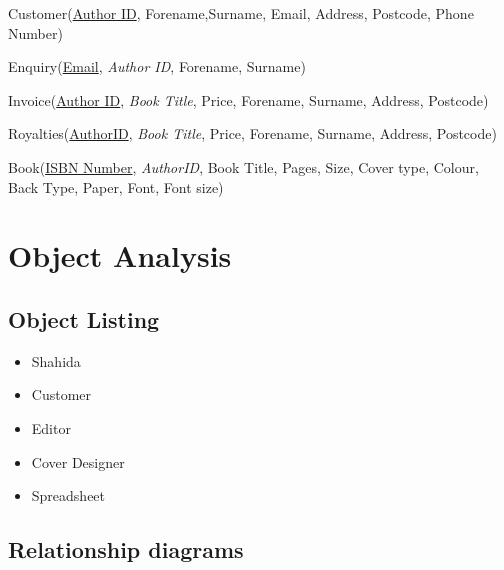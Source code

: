 Customer(\underline{Author ID}, Forename,Surname, Email, Address, Postcode, Phone Number)

Enquiry(\underline{Email}, \emph{Author ID}, Forename, Surname)

Invoice(\underline{Author ID}, \emph{Book Title}, Price, Forename, Surname, Address, Postcode)

Royalties(\underline{AuthorID}, \emph{Book Title}, Price, Forename, Surname, Address, Postcode)

Book(\underline{ISBN Number}, \emph{AuthorID}, Book Title, Pages, Size, Cover type, Colour, Back Type, Paper, Font, Font size)

\section{Object Analysis}

\subsection{Object Listing}

\begin{itemize}
    \item Shahida
    \item Customer
    \item Editor
    \item Cover Designer
    \item Spreadsheet

\end{itemize}

\subsection{Relationship diagrams}

